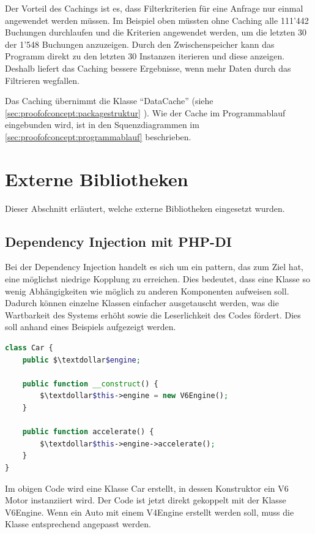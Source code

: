 Der Vorteil des Cachings ist es, dass Filterkriterien für eine Anfrage nur einmal angewendet werden müssen. Im Beispiel oben müssten ohne Caching alle 111'442 Buchungen durchlaufen und die Kriterien angewendet werden, um die letzten 30 der 1'548 Buchungen anzuzeigen. Durch den Zwischenspeicher kann das Programm direkt zu den letzten 30 Instanzen iterieren und diese anzeigen. Deshalb liefert das Caching bessere Ergebnisse, wenn mehr Daten durch das Filtrieren wegfallen.

Das Caching übernimmt die Klasse "`DataCache"' (siehe \cref{sec:proofofconcept:packagestruktur} ). Wie der Cache im Programmablauf eingebunden wird, ist in den Squenzdiagrammen im \cref{sec:proofofconcept:programmablauf}  beschrieben.

\section{Externe Bibliotheken}
\label{sec:proofofconcept:externebibliotheken}
Dieser Abschnitt erläutert, welche externe Bibliotheken eingesetzt wurden.

\subsection{Dependency Injection mit PHP-DI}
\label{sec:proofofconcept:dependency-injection}
Bei der Dependency Injection handelt es sich um ein \gls{pattern},
das zum Ziel hat, eine möglichst niedrige Kopplung zu erreichen. Dies bedeutet, dass eine Klasse so wenig Abhängigkeiten wie möglich zu anderen Komponenten aufweisen soll. Dadurch können einzelne Klassen einfacher ausgetauscht werden, was die Wartbarkeit des Systems erhöht sowie die Leserlichkeit des Codes fördert. Dies soll anhand eines Beispiels aufgezeigt werden.

\begin{lstlisting}[language=php]
class Car {
	public $\textdollar$engine;
	
	public function __construct() {
		$\textdollar$this->engine = new V6Engine();
	}
	
	public function accelerate() {
		$\textdollar$this->engine->accelerate();
	}
}
\end{lstlisting}

Im obigen Code wird eine Klasse Car erstellt, in dessen Konstruktor ein V6 Motor instanziiert  wird. Der Code ist jetzt direkt gekoppelt mit der Klasse V6Engine. Wenn ein Auto mit einem V4Engine erstellt werden soll, muss die Klasse entsprechend angepasst werden. 


